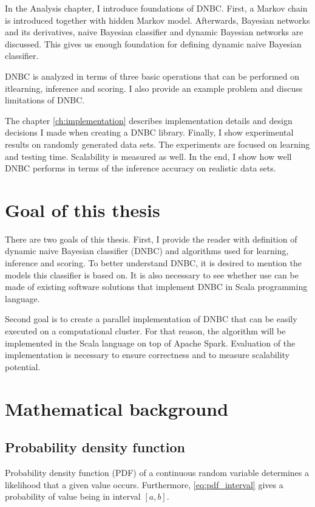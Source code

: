 \documentclass[thesis=B,english]{FITthesis}[2012/06/26]
\begin{document}
\begin{introduction}
In the Analysis chapter, I introduce foundations of DNBC. First, a Markov chain is introduced together with hidden Markov model. Afterwards, Bayesian networks and its derivatives, naive Bayesian classifier and dynamic Bayesian networks are discussed. This gives us enough foundation for defining dynamic naive Bayesian classifier.

DNBC is analyzed in terms of three basic operations that can be performed on it\textemdash learning, inference and scoring. I also provide an example problem and discuss limitations of DNBC.

The chapter \ref{ch:implementation} describes implementation details and design decisions I made when creating a DNBC library. Finally, I show experimental results on randomly generated data sets. The experiments are focused on learning and testing time. Scalability is measured as well. In the end, I show how well DNBC performs in terms of the inference accuracy on realistic data sets.
\end{introduction}

\chapter{Goal of this thesis}
There are two goals of this thesis. First, I provide the reader with definition of dynamic naive Bayesian classifier (DNBC) and algorithms used for learning, inference and scoring. To better understand DNBC, it is desired to mention the models this classifier is based on. It is also necessary to see whether use can be made of existing software solutions that implement DNBC in Scala programming language.

Second goal is to create a parallel implementation of DNBC that can be easily executed on a computational cluster. For that reason, the algorithm will be implemented in the Scala language on top of Apache Spark. Evaluation of the implementation is necessary to ensure correctness and to measure scalability potential.

\chapter{Mathematical background}

\section{Probability density function}

Probability density function (PDF) of a continuous random variable determines a likelihood that a given value occurs. Furthermore, \ref{eq:pdf_interval} gives a probability of value being in interval $[a,b]$.
\end{document}
